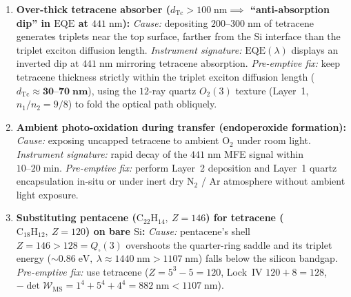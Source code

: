 \documentclass[11pt,a4paper]{article}
\theoremstyle{plain}
\theoremstyle{definition}
\begin{document}
\begin{enumerate}[label=\textbf{(F\arabic*)},leftmargin=*,noitemsep]
\item \textbf{Over-thick tetracene absorber ($d_{\mathrm{Tc}} > 100\;\text{nm} \implies$ ``anti-absorption dip'' in $\mathrm{EQE}$ at $441\;\text{nm}$):}
  \emph{Cause:} depositing $200\text{--}300\;\text{nm}$ of tetracene generates triplets near the top surface, farther from the $\mathrm{Si}$ interface than the triplet exciton diffusion length.
  \emph{Instrument signature:} $\mathrm{EQE}(\lambda)$ displays an inverted dip at $441\;\text{nm}$ mirroring tetracene absorption.
  \emph{Pre-emptive fix:} keep tetracene thickness strictly within the triplet exciton diffusion length ($d_{\mathrm{Tc}} \approx \mathbf{30\text{--}70\;\text{nm}}$), using the $12$-ray quartz $O_2(3)$ texture (Layer~1, $n_1/n_2=9/8$) to fold the optical path obliquely.
\item \textbf{Ambient photo-oxidation during transfer (endoperoxide formation):}
  \emph{Cause:} exposing uncapped tetracene to ambient $\mathrm{O_2}$ under room light.
  \emph{Instrument signature:} rapid decay of the $441\;\text{nm}$ MFE signal within $10\text{--}20\;\text{min}$.
  \emph{Pre-emptive fix:} perform Layer~2 deposition and Layer~1 quartz encapsulation in-situ or under inert dry $\mathrm{N_2}$ / $\mathrm{Ar}$ atmosphere without ambient light exposure.
\item \textbf{Substituting pentacene ($\mathrm{C_{22}H_{14}},\ Z=146$) for tetracene ($\mathrm{C_{18}H_{12}},\ Z=120$) on bare $\mathrm{Si}$:}
  \emph{Cause:} pentacene's shell $Z=146 > 128 = Q_\square(3)$ overshoots the quarter-ring saddle and its triplet energy ($\sim 0.86\;\text{eV},\ \lambda\approx 1440\;\text{nm} > 1107\;\text{nm}$) falls below the silicon bandgap.
  \emph{Pre-emptive fix:} use tetracene ($Z = 5^3 - 5 = 120$, Lock~IV $120 + 8 = 128$, $-\det\mathcal{W}_{\mathrm{MS}} = 1^4+5^4+4^4 = 882\;\text{nm} < 1107\;\text{nm}$).
\end{enumerate}
\end{document}
